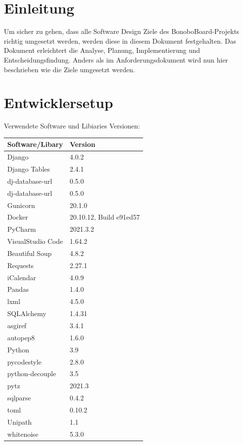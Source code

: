 \documentclass[a4paper,11pt]{scrartcl}
\begin{document}



\section{Einleitung}
Um sicher zu gehen, dass alle Software Design Ziele des BonoboBoard-Projekts richtig umgesetzt werden, werden diese in diesem Dokument festgehalten. Das Dokument erleichtert die Analyse, Planung, Implementierung und Entscheidungsfindung. Anders als im Anforderungsdokument wird nun hier beschrieben wie die Ziele umgesetzt werden. 


\section{Entwicklersetup}
Verwendete Software und Libiaries Versionen:
\begin{table}[H]
\begin{tabular}{|p{4cm}|p{8cm}|}
\hline
\textbf{Software/Libary} & \textbf{Version} \\ \hline
	Django &  4.0.2\\ \hline
	Django Tables & 2.4.1 \\ \hline
	dj-database-url & 0.5.0 \\ \hline
	dj-database-url & 0.5.0 \\ \hline
	Gunicorn & 20.1.0 \\ \hline
	Docker & 20.10.12, Build e91ed57 \\ \hline
	PyCharm & 2021.3.2 \\ \hline
	VisualStudio Code & 1.64.2 \\ \hline
	Beautiful Soup & 4.8.2 \\ \hline
	Requests & 2.27.1 \\ \hline
	iCalendar & 4.0.9 \\ \hline
	Pandas & 1.4.0 \\ \hline
	lxml & 4.5.0 \\ \hline
	SQLAlchemy & 1.4.31 \\ \hline
	asgiref & 3.4.1 \\ \hline
	autopep8 & 1.6.0 \\ \hline
	Python & 3.9 \\ \hline
	pycodestyle & 2.8.0 \\ \hline
	python-decouple & 3.5 \\ \hline
	pytz & 2021.3 \\ \hline
	sqlparse & 0.4.2 \\ \hline
	toml & 0.10.2 \\ \hline
	Unipath & 1.1 \\ \hline
	whitenoise & 5.3.0 \\ \hline
\end{tabular}
\end{table}
\end{document}
